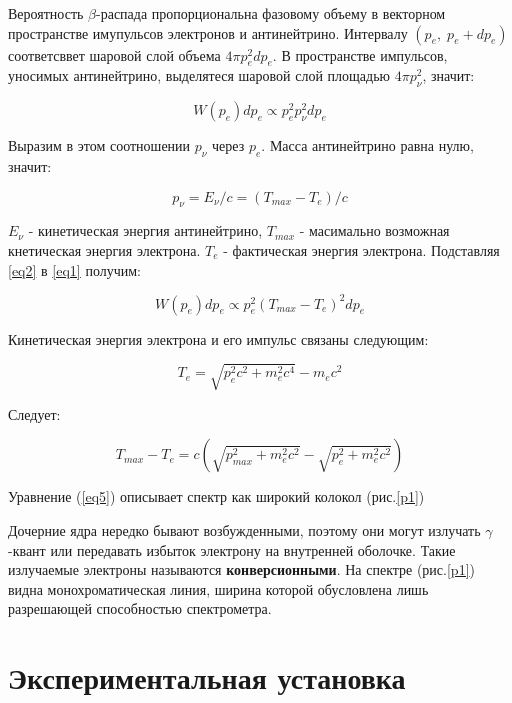 \documentclass[a4paper]{article}
\begin{document}
Вероятность $\beta$-распада пропорциональна фазовому объему в векторном пространстве имупульсов
электронов и антинейтрино. Интервалу $(p_e, \; p_e+dp_e)$ соответсввет шаровой слой объема 
$4\pi p_e^2 dp_e$. В пространстве импульсов, уносимых антинейтрино, выделятеся шаровой слой 
площадью $4 \pi p_{\nu}^2$, значит:

\begin{equation}
    W(p_e) dp_e \propto p_e^2 p_{\nu}^2 dp_e 
    \label{eq1}
\end{equation}

Выразим в этом соотношении $p_{\nu}$ через $p_e$. Масса антинейтрино равна нулю, значит:

\begin{equation}
    p_{\nu} = E_{\nu} / c = (T_{max} - T_e)/c
    \label{eq2}
\end{equation}

$E_{\nu}$ - кинетическая энергия антинейтрино, $T_{max}$ - масимально возможная кнетическая энергия
электрона. $T_e$ - фактическая энергия электрона. Подставляя \ref{eq2} в \ref{eq1} получим:

\begin{equation}
    W(p_e)dp_e \propto p_e^2 (T_{max} - T_e)^2 dp_e
    \label{eq3}
\end{equation}

Кинетическая энергия электрона и его импульс связаны следующим:

\begin{equation}
    T_e = \sqrt{p_e^2 c^2 + m_e^2 c^4} - m_e c^2
    \label{eq4}
\end{equation}

Следует:

\begin{equation}
    T_{max} - T_e = c (\sqrt{p_{max}^2 + m_e^2 c^2} - \sqrt{p_e^2 + m_e^2 c^2})
    \label{eq5}
\end{equation}

Уравнение (\ref{eq5}) описывает спектр как широкий колокол (рис.\ref{p1}) 

Дочерние ядра нередко бывают возбужденными, поэтому они могут излучать $\gamma$-квант или 
передавать избыток электрону на внутренней оболочке. Такие излучаемые электроны называются 
\textbf{конверсионными}. На спектре  (рис.\ref{p1}) видна монохроматическая линия, ширина
которой обусловлена лишь разрешающей способностью спектрометра.

\section{Экспериментальная установка}
\end{document}
